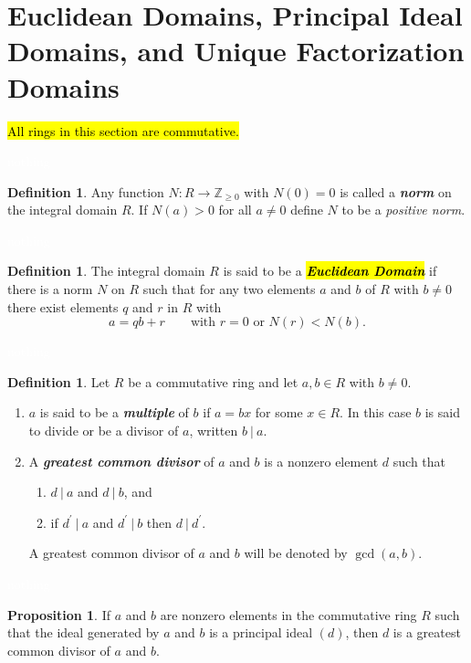 \documentclass{article}
\theoremstyle{definition}
\newtheorem{prop}[thm]{Proposition}
\newtheorem{defn}[thm]{Definition}
\newcommand{\nl}{\textcolor{white}{nothing}}
\newcommand{\ra}{\rightarrow}
\newcommand{\p}{\prime}
\newcommand{\Z}{\mathbb{Z}}
\begin{document}
\section{Euclidean Domains, Principal Ideal Domains, and Unique Factorization Domains}

\hl{All rings in this section are commutative.}

\nl

\begin{defn}
Any function $N:R\ra \Z_{\geq 0}$ with $N(0) = 0$ is called a \textit{\textbf{norm}} on the integral domain $R$. If $N(a)> 0$ for all $a\neq 0$ define $N$ to be a \textit{positive norm}.
\end{defn}

\nl

\begin{defn}
The integral domain $R$ is said to be a \hl{\textit{\textbf{Euclidean Domain}}} if there is a norm $N$ on $R$ such that for any two elements $a$ and $b$ of $R$ with $b\neq 0$ there exist elements $q$ and $r$ in $R$ with 
\[a = qb + r\qquad \text{with } r = 0 \text{ or } N(r)<N(b).\]
\end{defn}

\nl

\begin{defn}
Let $R$ be a commutative ring and let $a,b\in R$ with $b\neq 0$.
\begin{enumerate}
\item $a$ is said to be a \textbf{\textit{multiple}} of $b$ if $a = bx$ for some $x\in R$. In this case $b$ is said to divide or be a divisor of $a$, written $b\ |\ a$.
\item A \textbf{\textit{greatest common divisor}} of $a$ and $b$ is a nonzero element $d$ such that 
\begin{enumerate}
\item $d\ |\ a$ and $d\ |\ b$, and 
\item if $d^\p\ |\ a$ and $d^\p\ |\ b$ then $d\ |\ d^\p$.
\end{enumerate}
A greatest common divisor of $a$ and $b$ will be denoted by $\gcd(a,b)$.
\end{enumerate}
\end{defn}

\nl

\begin{prop}
If $a$ and $b$ are nonzero elements in the commutative ring $R$ such that the ideal generated by $a$ and $b$ is a principal ideal $(d)$, then $d$ is a greatest common divisor of $a$ and $b$.
\end{prop}
\end{document}
